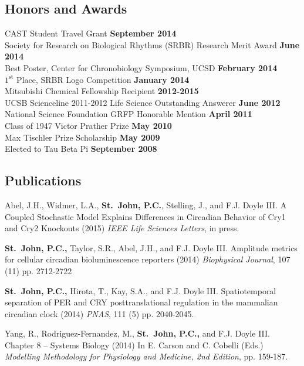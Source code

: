 {\subsection*{Honors and Awards} 
CAST Student Travel Grant \hfill {\bfseries September 2014}\\
Society for Research on Biological Rhythms (SRBR) Research Merit Award \hfill {\bf June 2014}\\
Best Poster, Center for Chronobiology Symposium, UCSD \hfill {\bf February 2014} \\
$1^\textrm{st}$ Place, SRBR Logo Competition \hfill {\bf January 2014} \\
Mitsubishi Chemical Fellowship Recipient \hfill {\bf 2012-2015} \\
UCSB Scienceline 2011-2012 Life Science Outstanding Answerer \hfill {\bf June 2012} \\
National Science Foundation GRFP Honorable Mention \hfill {\bf April 2011} \\
Class of 1947 Victor Prather Prize \hfill {\bf May 2010}\\
Max Tischler Prize Scholarship \hfill  {\bf May 2009}\\
Elected to Tau Beta Pi \hfill  {\bf September 2008}\\

\subsection*{Publications}
Abel, J.H., Widmer, L.A., {\bfseries St.\ John, P.C.}, Stelling, J., and F.J. Doyle III. A Coupled Stochastic Model Explains Differences in Circadian Behavior of Cry1 and Cry2 Knockouts (2015) {\itshape IEEE Life Sciences Letters}, in press.

{\bfseries St.\ John, P.C.,} Taylor, S.R., Abel, J.H., and F.J. Doyle III. Amplitude metrics for cellular circadian bioluminescence reporters (2014) {\itshape Biophysical Journal}, 107 (11) pp. 2712-2722

{\bfseries St.\ John, P.C.,} Hirota, T., Kay, S.A., and F.J. Doyle III.
Spatiotemporal separation of PER and CRY posttranslational regulation in the
mammalian circadian clock (2014) {\itshape PNAS}, 111 (5) pp. 2040-2045.

Yang, R., Rodriguez-Fernandez, M., {\bfseries St.\ John, P.C.,} and F.J. Doyle III. Chapter 8 -- Systems Biology (2014) In E. Carson and C. Cobelli (Eds.)
{\itshape Modelling Methodology for Physiology and Medicine, 2nd Edition}, pp.
159-187.

}

